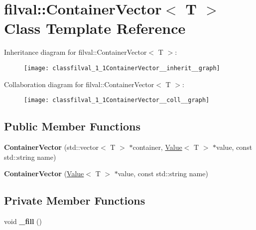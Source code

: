 \hypertarget{classfilval_1_1ContainerVector}{}\section{filval\+:\+:Container\+Vector$<$ T $>$ Class Template Reference}
\label{classfilval_1_1ContainerVector}


Inheritance diagram for filval\+:\+:Container\+Vector$<$ T $>$\+:
\nopagebreak
\begin{figure}[H]
\begin{center}
\leavevmode
\texttt{[image: classfilval\_1\_1ContainerVector\_\_inherit\_\_graph]}
\end{center}
\end{figure}


Collaboration diagram for filval\+:\+:Container\+Vector$<$ T $>$\+:
\nopagebreak
\begin{figure}[H]
\begin{center}
\leavevmode
\texttt{[image: classfilval\_1\_1ContainerVector\_\_coll\_\_graph]}
\end{center}
\end{figure}
\subsection*{Public Member Functions}
\begin{DoxyCompactItemize}
\item 
\hypertarget{classfilval_1_1ContainerVector_a88ec0094521831269a3366cb5d82df22}{}\label{classfilval_1_1ContainerVector_a88ec0094521831269a3366cb5d82df22} 
{\bfseries Container\+Vector} (std\+::vector$<$ T $>$ $\ast$container, \hyperlink{classfilval_1_1Value}{Value}$<$ T $>$ $\ast$value, const std\+::string name)
\item 
\hypertarget{classfilval_1_1ContainerVector_a8d6818ab7025e0abb693a69dfe612961}{}\label{classfilval_1_1ContainerVector_a8d6818ab7025e0abb693a69dfe612961} 
{\bfseries Container\+Vector} (\hyperlink{classfilval_1_1Value}{Value}$<$ T $>$ $\ast$value, const std\+::string name)
\end{DoxyCompactItemize}
\subsection*{Private Member Functions}
\begin{DoxyCompactItemize}
\item 
\hypertarget{classfilval_1_1ContainerVector_aa95fdd87f2df677fe6440e26f1ef2417}{}\label{classfilval_1_1ContainerVector_aa95fdd87f2df677fe6440e26f1ef2417} 
void {\bfseries \+\_\+fill} ()
\end{DoxyCompactItemize}
